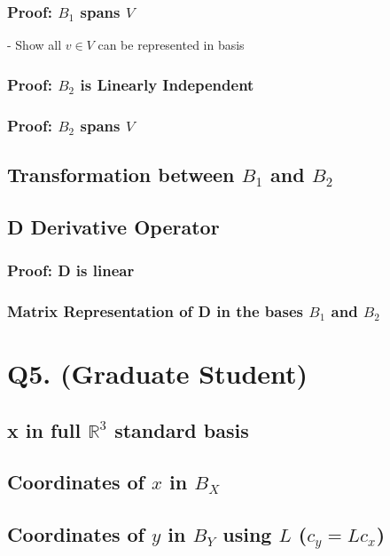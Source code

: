 \documentclass{article}
\begin{document}
    \subsubsection{Proof: $B_1$ spans $V$}
    - Show all $v \in V$ can be represented in basis

    \subsubsection{Proof: $B_2$ is Linearly Independent}

    \subsubsection{Proof: $B_2$ spans $V$}

    \subsection{Transformation between $B_1$ and $B_2$}

    \subsection{D Derivative Operator}

    \subsubsection{Proof: D is linear}

    \subsubsection{Matrix Representation of D in the bases $B_1$ and $B_2$}

    \section{Q5. (Graduate Student)}

    \subsection{x in full $\mathbb{R}^3$ standard basis}
    \subsection{Coordinates of $x$ in $B_X$}
    \subsection{Coordinates of $y$ in $B_Y$ using $L$ ($c_y = Lc_x$)}
\end{document}
